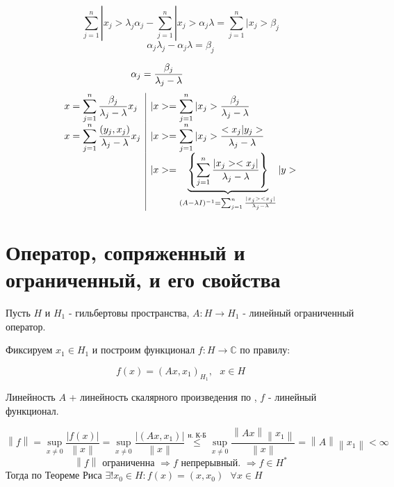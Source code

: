 \documentclass[12pt, a4paper]{report}
\begin{document}
\fi


\[ \sum_{j=1}^{ n } |x_j >\lambda_j \alpha_j  - \sum_{j=1}^n |x_j > \alpha_j \lambda = \sum_{j=1}^n |x_j > \beta_j  \] 
\[ \alpha_j \lambda_j - \alpha_j \lambda = \beta_j  \] 

\[ \kern-1.7cm\alpha_j = \frac{\beta_j }{\lambda_j - \lambda}  \] 
\vspace{-10pt}
\[ \begin{array}{l|l}
    \displaystyle  x = \sum_{j=1}^n \frac{\beta_j }{\lambda_j - \lambda} x_j &\displaystyle  |x> = \sum_{j=1}^n |x_j > \frac{\beta_j }{\lambda_j - \lambda}\\  
    x = \displaystyle  \sum_{j=1}^n \frac{(y_j ,x_j ) }{ \lambda_j - \lambda }x_j & \displaystyle |x> = \sum_{j =1}^n |x_j > \frac{<x_j |y_j >}{\lambda_j - \lambda}  \\
     \displaystyle  & \displaystyle  |x > = \underbrace{\left\{  \sum_{j =1}^n \frac{|x_j > <x_j | }{\lambda_j - \lambda } \right\}}_{(A - \lambda I )^{-1 }   = \sum_{j=1}^n\frac{|x_j > < x_j | }{\lambda_j -\lambda}  } |y>
\end{array} \]  

\section{Оператор, сопряженный и ограниченный, и его свойства}

Пусть \( H \) и \( H_1 \)  - гильбертовы пространства, \( A : H \to  H_1\)  - линейный ограниченный оператор. 

Фиксируем \( x_1 \in  H_1  \)  и построим функционал \( f : H \to  \mathbb{C} \) по правилу: 

\[ f(x  ) = (A x , x_1 ) _{H_1 } , \text{ }  x \in  H  \]  

Линейность \( A \) + линейность скалярного произведения по , \( f \) - линейный функционал. 

\[ \left\lVert f  \right\rVert = \sup _{x \neq 0 }  \frac{ \left\lvert f(x ) \right\rvert}{\left\lVert x  \right\rVert} = \sup _{x \neq 0 }  \frac{ \left\lvert (Ax , x_1 ) \right\rvert}{\left\lVert x  \right\rVert}  \overset{\text{н. К-Б} }{\le } \sup _{x \neq 0 } \frac{ \left\lVert A x  \right\rVert \left\lVert x_1  \right\rVert}{ \left\lVert x  \right\rVert} = \left\lVert A  \right\rVert \left\lVert x_1  \right\rVert      < \infty \] 
\[ \left\lVert f  \right\rVert \text{ ограниченна } \Rightarrow f \text{ непрерывный. } \Rightarrow f \in H^*    \] 
Тогда по Теореме Риса \( \exists  ! x_0 \in  H : f (x ) = (x , x_0)  \text{ }  \forall  x \in  H \) 
\end{document}
